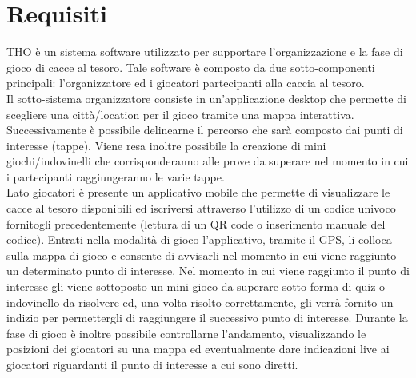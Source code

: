 \documentclass[12pt, italian]{article}
\begin{document}
\section{Requisiti}
THO è un sistema software utilizzato per supportare l'organizzazione e la fase di gioco di cacce al tesoro. Tale software è composto da due sotto-componenti principali: l'organizzatore ed i giocatori partecipanti alla caccia al tesoro.\\
Il sotto-sistema organizzatore consiste in un'applicazione desktop che permette di scegliere una città/location per il gioco tramite una mappa interattiva. Successivamente è possibile delinearne il percorso che sarà composto dai punti di interesse (tappe). Viene resa inoltre possibile la creazione di mini giochi/indovinelli che corrisponderanno alle prove da superare nel momento in cui i partecipanti raggiungeranno le varie tappe.\\
Lato giocatori è presente un applicativo mobile che permette di visualizzare le cacce al tesoro disponibili ed iscriversi attraverso l'utilizzo di un codice univoco fornitogli precedentemente (lettura di un QR code o inserimento manuale del codice). Entrati nella modalità di gioco l'applicativo, tramite il GPS, li colloca sulla mappa di gioco e consente di avvisarli nel momento in cui viene raggiunto un determinato punto di interesse. Nel momento in cui viene raggiunto il punto di interesse gli viene sottoposto un mini gioco da superare sotto forma di quiz o indovinello da risolvere ed, una volta risolto correttamente, gli verrà fornito un indizio per permettergli di raggiungere il successivo punto di interesse.
Durante la fase di gioco è inoltre possibile controllarne l'andamento, visualizzando le posizioni dei giocatori su una mappa ed eventualmente dare indicazioni live ai giocatori riguardanti il punto di interesse a cui sono diretti.\\
\end{document}
